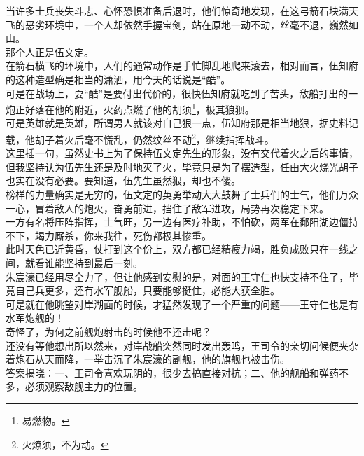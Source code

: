 \begin{multicols}{\theparacolNo}
当许多士兵丧失斗志、心怀恐惧准备后退时，他们惊奇地发现，在这弓箭石块满天飞的恶劣环境中，一个人却依然手握宝剑，站在原地一动不动，丝毫不退，巍然如山。\\

那个人正是伍文定。\\

在箭石横飞的环境中，人们的通常动作是手忙脚乱地爬来滚去，相对而言，伍知府的这种造型确是相当的潇洒，用今天的话说是“酷”。\\

可是在战场上，耍“酷”是要付出代价的，很快伍知府就吃到了苦头，敌船打出的一炮正好落在他的附近，火药点燃了他的胡须\footnote{易燃物。}，极其狼狈。\\

可是英雄就是英雄，所谓男人就该对自己狠一点，伍知府那是相当地狠，据史料记载，他胡子着火后毫不慌乱，仍然纹丝不动\footnote{火燎须，不为动。}，继续指挥战斗。\\

这里插一句，虽然史书上为了保持伍文定先生的形象，没有交代着火之后的事情，但我坚持认为伍先生还是及时地灭了火，毕竟只是为了摆造型，任由大火烧光胡子也实在没有必要。要知道，伍先生虽然狠，却也不傻。\\

榜样的力量确实是无穷的，伍文定的英勇举动大大鼓舞了士兵们的士气，他们万众一心，冒着敌人的炮火，奋勇前进，挡住了敌军进攻，局势再次稳定下来。\\

一方有名将压阵指挥，士气旺，另一边有医疗补助，不怕砍，两军在鄱阳湖边僵持不下，竭力厮杀，你来我往，死伤都极其惨重。\\

此时天色已近黄昏，仗打到这个份上，双方都已经精疲力竭，胜负成败只在一线之间，就看谁能坚持到最后一刻。\\

朱宸濠已经用尽全力了，但让他感到安慰的是，对面的王守仁也快支持不住了，毕竟自己兵更多，还有水军舰船，只要能够挺住，必能大获全胜。\\

可是就在他眺望对岸湖面的时候，才猛然发现了一个严重的问题——王守仁也是有水军炮舰的！\\

奇怪了，为何之前舰炮射击的时候他不还击呢？\\

还没有等他想出所以然来，对岸战船突然同时发出轰鸣，王司令的亲切问候便夹杂着炮石从天而降，一举击沉了朱宸濠的副舰，他的旗舰也被击伤。\\

答案揭晓：一、王司令喜欢玩阴的，很少去搞直接对抗；二、他的舰船和弹药不多，必须观察敌舰主力的位置。\\


\end{multicols}
